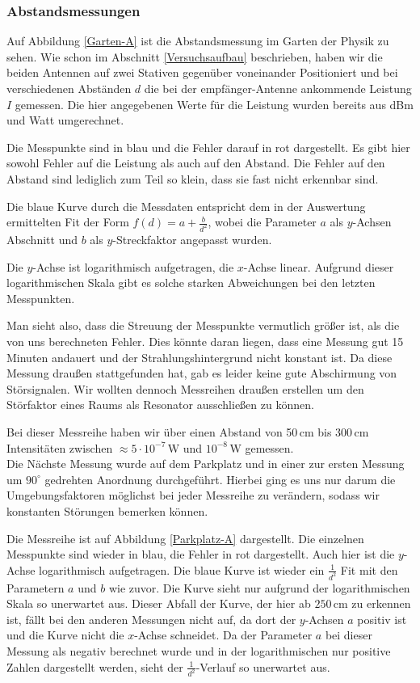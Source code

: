 \documentclass[titlepage,11pt,a4paper,ngerman]{article}
\newcommand{\tx}[1]{\textrm{#1}}
\begin{document}
\subsubsection{Abstandsmessungen}

Auf Abbildung \ref{Garten-A} ist die Abstandsmessung im Garten der Physik zu sehen. Wie schon im Abschnitt \ref{Versuchsaufbau} beschrieben, haben wir die beiden Antennen auf zwei Stativen gegenüber voneinander Positioniert und bei verschiedenen Abständen $ d $ die bei der empfänger-Antenne ankommende Leistung $ I $ gemessen. Die hier angegebenen Werte für die Leistung wurden bereits aus dBm und Watt umgerechnet.\par
Die Messpunkte sind in blau und die Fehler darauf in rot dargestellt. Es gibt hier sowohl Fehler auf die Leistung als auch auf den Abstand. Die Fehler auf den Abstand sind lediglich zum Teil so klein, dass sie fast nicht erkennbar sind.\par
Die blaue Kurve durch die Messdaten entspricht dem in der Auswertung ermittelten Fit der Form $ f(d) = a + \frac{b}{d^2} $, wobei die Parameter $ a $ als $ y $-Achsen Abschnitt und $ b $ als $ y $-Streckfaktor angepasst wurden.\par
Die $ y $-Achse ist logarithmisch aufgetragen, die $ x $-Achse linear. Aufgrund dieser logarithmischen Skala gibt es solche starken Abweichungen bei den letzten Messpunkten.\par
Man sieht also, dass die Streuung der Messpunkte vermutlich größer ist, als die von uns berechneten Fehler. Dies könnte daran liegen, dass eine Messung gut 15 Minuten andauert und der Strahlungshintergrund nicht konstant ist. Da diese Messung draußen stattgefunden hat, gab es leider keine gute Abschirmung von Störsignalen. Wir wollten dennoch Messreihen draußen erstellen um den Störfaktor eines Raums als Resonator ausschließen zu können.\par
Bei dieser Messreihe haben wir über einen Abstand von 50\,cm bis 300\,cm Intensitäten zwischen $ \approx 5 \cdot 10^{-7} \, \tx{W} $ und $ 10^{-8} \, \tx{W} $ gemessen.\\[10pt]
\noindent
Die Nächste Messung wurde auf dem Parkplatz und in einer zur ersten Messung um $ 90^\circ $ gedrehten Anordnung durchgeführt. Hierbei ging es uns nur darum die Umgebungsfaktoren möglichst bei jeder Messreihe zu verändern, sodass wir konstanten Störungen bemerken können.\par
Die Messreihe ist auf Abbildung \ref{Parkplatz-A} dargestellt. Die einzelnen Messpunkte sind wieder in blau, die Fehler in rot dargestellt. Auch hier ist die $ y $-Achse logarithmisch aufgetragen. Die blaue Kurve ist wieder ein $ \frac{1}{d^2} $ Fit mit den Parametern $ a $ und $ b $ wie zuvor. Die Kurve sieht nur aufgrund der logarithmischen Skala so unerwartet aus. Dieser Abfall der Kurve, der hier ab $ 250 \, \tx{cm} $ zu erkennen ist, fällt bei den anderen Messungen nicht auf, da dort der $ y $-Achsen $ a $ positiv ist und die Kurve nicht die $ x $-Achse schneidet. Da der Parameter $ a $ bei dieser Messung als negativ berechnet wurde und in der logarithmischen nur positive Zahlen dargestellt werden, sieht der $ \frac{1}{d^2} $-Verlauf so unerwartet aus.\par
\end{document}
